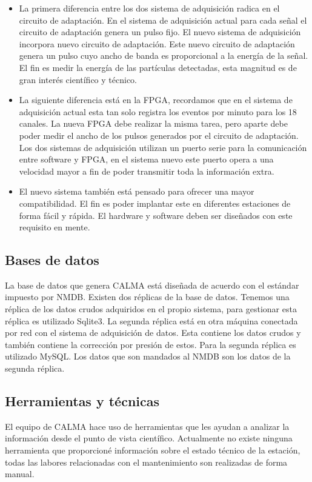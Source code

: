 		\begin{itemize}
			\item La primera diferencia entre los dos sistema de adquisición radica en el circuito de adaptación. En el sistema de
			  adquisición actual para cada señal el circuito de adaptación genera un pulso fijo. El nuevo sistema de adquisición incorpora
			  nuevo circuito de adaptación. Este nuevo circuito de adaptación genera un pulso cuyo ancho de banda es proporcional a la
			  energía de la señal. El fin es medir la energía de las partículas detectadas, esta magnitud es de gran interés científico y
			  técnico.
			\item La siguiente diferencia está en la FPGA, recordamos que en el sistema de adquisición actual esta tan solo registra los
			  eventos por minuto para los 18 canales. La nueva FPGA debe realizar la misma tarea, pero aparte debe poder medir el ancho de
			  los pulsos generados por el circuito de adaptación. Los dos sistemas de adquisición utilizan un puerto serie para la
			  comunicación entre software y FPGA, en el sistema nuevo este puerto opera a una velocidad mayor a fin de poder transmitir
			  toda la información extra.
			\item El nuevo sistema también está pensado para ofrecer una mayor compatibilidad. El fin es poder implantar este en
			  diferentes estaciones de forma fácil y rápida. El hardware y software deben ser diseñados con este requisito en mente.
		\end{itemize}
	\subsection{Bases de datos}
		La base de datos que genera CALMA está diseñada de acuerdo con el estándar impuesto por NMDB. Existen dos réplicas de la
		base de datos. Tenemos una réplica de los datos crudos adquiridos en el propio sistema, para gestionar esta réplica es utilizado
		Sqlite3. La segunda réplica está en otra máquina conectada por red con el sistema de adquisición de datos. Esta contiene los datos
		crudos y también contiene la corrección por presión de estos. Para la segunda réplica es utilizado MySQL. Los datos que son mandados
		al NMDB son los datos de la segunda réplica.
	\subsection{Herramientas y técnicas}
		El equipo de CALMA hace uso de herramientas que les ayudan a analizar la información desde el punto de vista científico. Actualmente
		no existe ninguna herramienta que proporcioné información sobre el estado técnico de la estación, todas las labores relacionadas con
		el mantenimiento son realizadas de forma manual.


